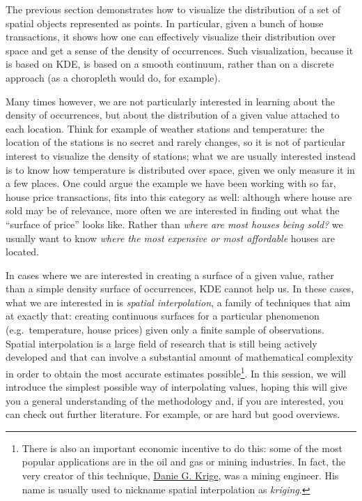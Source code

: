 \documentclass[]{book}
\let\rmarkdownfootnote\footnote%
\def\footnote{\protect\rmarkdownfootnote}
\begin{document}
The previous section demonstrates how to visualize the distribution of a set of spatial objects represented as points. In particular, given a bunch of house transactions, it shows how one can effectively visualize their distribution over space and get a sense of the density of occurrences. Such visualization, because it is based on KDE, is based on a smooth continuum, rather than on a discrete approach (as a choropleth would do, for example).

Many times however, we are not particularly interested in learning about the density of occurrences, but about the distribution of a given value attached to each location. Think for example of weather stations and temperature: the location of the stations is no secret and rarely changes, so it is not of particular interest to visualize the density of stations; what we are usually interested instead is to know how temperature is distributed over space, given we only measure it in a few places. One could argue the example we have been working with so far, house price transactions, fits into this category as well: although where house are sold may be of relevance, more often we are interested in finding out what the ``surface of price'' looks like. Rather than \emph{where are most houses being sold?} we usually want to know \emph{where the most expensive or most affordable} houses are located.

In cases where we are interested in creating a surface of a given value, rather than a simple density surface of occurrences, KDE cannot help us. In these cases, what we are interested in is \emph{spatial interpolation}, a family of techniques that aim at exactly that: creating continuous surfaces for a particular phenomenon (e.g.~temperature, house prices) given only a finite sample of observations. Spatial interpolation is a large field of research that is still being actively developed and that can involve a substantial amount of mathematical complexity in order to obtain the most accurate estimates possible\footnote{There is also an important economic incentive to do this: some of the most popular applications are in the oil and gas or mining industries. In fact, the very creator of this technique, \href{https://en.wikipedia.org/wiki/Danie_G._Krige}{Danie G. Krige}, was a mining engineer. His name is usually used to nickname spatial interpolation as \emph{kriging}.}. In this session, we will introduce the simplest possible way of interpolating values, hoping this will give you a general understanding of the methodology and, if you are interested, you can check out further literature. For example, \citet{banerjee2014hierarchical} or \citet{cressie2015statistics} are hard but good overviews.
\end{document}
